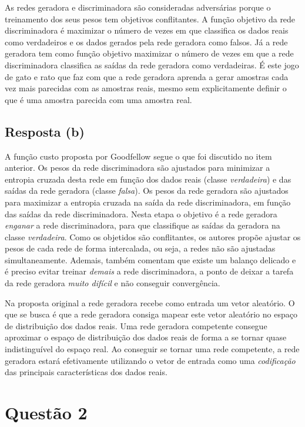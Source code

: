 \documentclass[final,3p]{elsarticle}
\numberwithin{equation}{section}
\begin{document}
        As redes geradora e discriminadora são consideradas adversárias porque o treinamento dos seus pesos tem objetivos conflitantes. A função objetivo da rede discriminadora é maximizar o número de vezes em que classifica os dados reais como verdadeiros e os dados gerados pela rede geradora como falsos. Já a rede geradora tem como função objetivo maximizar o número de vezes em que a rede discriminadora classifica as saídas da rede geradora como verdadeiras. É este jogo de gato e rato que faz com que a rede geradora aprenda a gerar amostras cada vez mais parecidas com as amostras reais, mesmo sem explicitamente definir o que é uma amostra parecida com uma amostra real.

    \subsection{Resposta \textbf{(b)}}

        A função custo proposta por Goodfellow segue o que foi discutido no item anterior. Os pesos da rede discriminadora são ajustados para minimizar a entropia cruzada desta rede em função dos dados reais (classe \emph{verdadeira}) e das saídas da rede geradora (classe \emph{falsa}). Os pesos da rede geradora são ajustados para maximizar a entropia cruzada na saída da rede discriminadora, em função das saídas da rede discriminadora. Nesta etapa o objetivo é a rede geradora \emph{enganar} a rede discriminadora, para que classifique as saídas da geradora na classe \emph{verdadeira}. Como os objetidos são conflitantes, os autores propõe ajustar os pesos de cada rede de forma intercalada, ou seja, a redes não são ajustadas simultaneamente. Ademais, também comentam que existe um balanço delicado e é preciso evitar treinar \emph{demais} a rede discriminadora, a ponto de deixar a tarefa da rede geradora \emph{muito difícil} e não conseguir convergência.

        Na proposta original a rede geradora recebe como entrada um vetor aleatório. O que se busca é que a rede geradora consiga mapear este vetor aleatório no espaço de distribuição dos dados reais. Uma rede geradora competente consegue aproximar o espaço de distribuição dos dados reais de forma a se tornar quase indistinguível do espaço real. Ao conseguir se tornar uma rede competente, a rede geradora estará efetivamente utilizando o vetor de entrada como uma \emph{codificação} das principais características dos dados reais.

\section{Questão 2}
\end{document}
